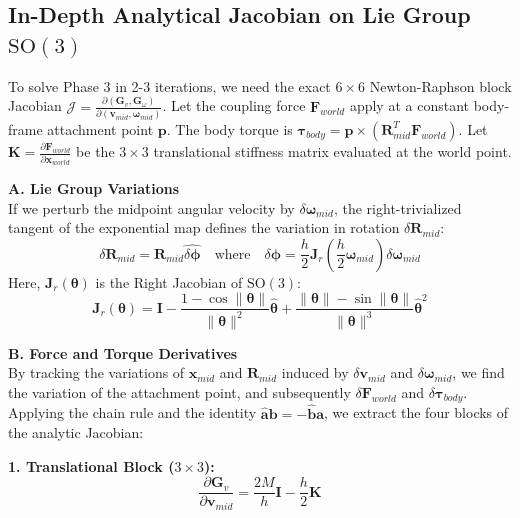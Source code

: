 \subsection{In-Depth Analytical Jacobian on Lie Group \texorpdfstring{$\text{SO}(3)$}{SO(3)}}
To solve Phase 3 in 2-3 iterations, we need the exact $6 \times 6$ Newton-Raphson block Jacobian $\mathcal{J} = \frac{\partial (\mathbf{G}_v, \mathbf{G}_\omega)}{\partial (\mathbf{v}_{mid}, \boldsymbol{\omega}_{mid})}$.
Let the coupling force $\mathbf{F}_{world}$ apply at a constant body-frame attachment point $\mathbf{p}$. The body torque is $\boldsymbol{\tau}_{body} = \mathbf{p} \times (\mathbf{R}_{mid}^T \mathbf{F}_{world})$. Let $\mathbf{K} = \frac{\partial \mathbf{F}_{world}}{\partial \mathbf{x}_{world}}$ be the $3 \times 3$ translational stiffness matrix evaluated at the world point.

\textbf{A. Lie Group Variations}\\
If we perturb the midpoint angular velocity by $\delta \boldsymbol{\omega}_{mid}$, the right-trivialized tangent of the exponential map defines the variation in rotation $\delta \mathbf{R}_{mid}$:
\begin{equation}
    \delta \mathbf{R}_{mid} = \mathbf{R}_{mid} \widehat{\delta \boldsymbol{\phi}} \quad \text{where} \quad \delta \boldsymbol{\phi} = \frac{h}{2} \mathbf{J}_r\left(\frac{h}{2} \boldsymbol{\omega}_{mid}\right) \delta \boldsymbol{\omega}_{mid}
\end{equation}
Here, $\mathbf{J}_r(\boldsymbol{\theta})$ is the Right Jacobian of $\text{SO}(3)$:
\begin{equation}
    \mathbf{J}_r(\boldsymbol{\theta}) = \mathbf{I} - \frac{1 - \cos\|\boldsymbol{\theta}\|}{\|\boldsymbol{\theta}\|^2} \widehat{\boldsymbol{\theta}} + \frac{\|\boldsymbol{\theta}\| - \sin\|\boldsymbol{\theta}\|}{\|\boldsymbol{\theta}\|^3} \widehat{\boldsymbol{\theta}}^2
\end{equation}

\textbf{B. Force and Torque Derivatives}\\
By tracking the variations of $\mathbf{x}_{mid}$ and $\mathbf{R}_{mid}$ induced by $\delta \mathbf{v}_{mid}$ and $\delta \boldsymbol{\omega}_{mid}$, we find the variation of the attachment point, and subsequently $\delta \mathbf{F}_{world}$ and $\delta \boldsymbol{\tau}_{body}$. Applying the chain rule and the identity $\widehat{\mathbf{a}}\mathbf{b} = -\widehat{\mathbf{b}}\mathbf{a}$, we extract the four blocks of the analytic Jacobian:

\textbf{1. Translational Block ($3 \times 3$):}
\begin{equation}
    \frac{\partial \mathbf{G}_v}{\partial \mathbf{v}_{mid}} = \frac{2M}{h} \mathbf{I} - \frac{h}{2} \mathbf{K}
\end{equation}

